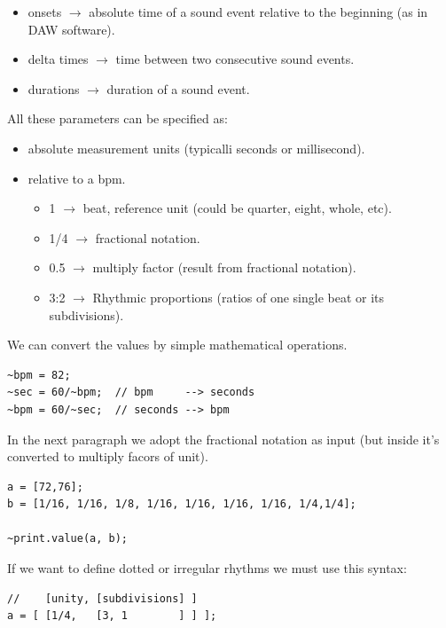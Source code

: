 \begin{itemize}
\tightlist
\item onsets \(\rightarrow\) absolute time of a sound event relative to the beginning (as in DAW software).
\item delta times \(\rightarrow\) time between two consecutive sound events.
\item durations \(\rightarrow\) duration of a sound event.
\end{itemize}

All these parameters can be specified as:

\begin{itemize}
\tightlist
\item absolute measurement units (typicalli seconds or millisecond).
\item relative to a bpm.

  \begin{itemize}
  \tightlist
  \item 1 \(\rightarrow\) beat, reference unit (could be quarter, eight, whole, etc).
  \item 1/4 \(\rightarrow\) fractional notation.
  \item 0.5 \(\rightarrow\) multiply factor (result from fractional notation).
  \item 3:2 \(\rightarrow\) Rhythmic proportions (ratios of one single beat or its subdivisions).
  \end{itemize}
\end{itemize}

We can convert the values by simple mathematical operations.

\begin{lstlisting}[frame=single] 
~bpm = 82;
~sec = 60/~bpm;  // bpm     --> seconds
~bpm = 60/~sec;  // seconds --> bpm          
\end{lstlisting}

In the next paragraph we adopt the fractional notation as input (but inside it's converted to multiply facors of unit).

\begin{lstlisting}[frame=single] 
a = [72,76];
b = [1/16, 1/16, 1/8, 1/16, 1/16, 1/16, 1/16, 1/4,1/4];

~print.value(a, b);
\end{lstlisting}

If we want to define dotted or irregular rhythms we must use this syntax:

\begin{lstlisting}[frame=single] 
//    [unity, [subdivisions] ]
a = [ [1/4,   [3, 1        ] ] ];
\end{lstlisting}

